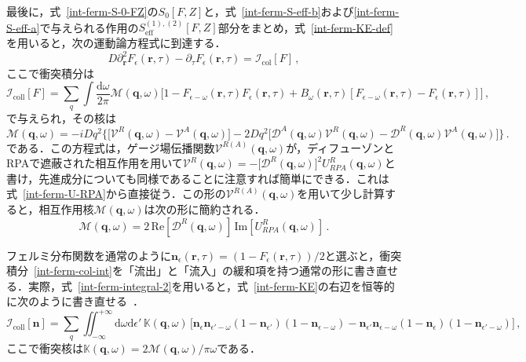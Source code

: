 \documentclass[a4paper,11pt]{ltjsarticle}
\def\d{\mathrm{d}}
\def\qo{(\mathbf{q},\omega)}
\begin{document}
最後に，式~\eqref{int-ferm-S-0-FZ}の$S_{0}[F,Z]$と，式~\eqref{int-ferm-S-eff-b}および\eqref{int-ferm-S-eff-a}で与えられる作用の$S^{(1),(2)}_{\mathrm{eff}}[F,Z]$部分をまとめ，式~\eqref{int-ferm-KE-def}を用いると，次の運動論方程式に到達する．
\begin{equation}\label{int-ferm-KE}
D\partial^{2}_{\mathbf{r}}F_{\epsilon}(\mathbf{r},\tau)-\partial_{\tau}
F_{\epsilon}(\mathbf{r},\tau)=\mathcal{I}_{\mathrm{col}}[F]\,,
\end{equation}
ここで衝突積分は
\begin{equation}\label{int-ferm-col-int}
\mathcal{I}_{\mathrm{coll}}[F]=\sum_{q}\int\frac{\d\omega}{2\pi}\mathcal{M}
\qo\Big[1 - F_{\epsilon-\omega}(\mathbf{r},\tau)
F_{\epsilon}(\mathbf{r},\tau) + B_{\omega}(\mathbf{r},\tau)
[F_{\epsilon-\omega}(\mathbf{r},\tau)-F_{\epsilon}(\mathbf{r},\tau)]\Big]\,,
\end{equation}
で与えられ，その核は
\begin{equation}
\mathcal{M}\qo=-iDq^2\Big\{\big[\mathcal{V}^{R}\qo-\mathcal{V}^{A}\qo\big]-2Dq^2
\big[\mathcal{D}^{A}\qo\mathcal{V}^{R}\qo-\mathcal{D}^{R}\qo\mathcal{V}^{A}\qo\big]\Big\}\,.
\end{equation}
である．この方程式は，ゲージ場伝播関数$\mathcal{V}^{R(A)}\qo$が，ディフューゾンとRPAで遮蔽された相互作用を用いて$\mathcal{V}^{R}\qo=-\big[\mathcal{D}^{R}\qo\big]^2U^{R}_{RPA}\qo$と書け，先進成分についても同様であることに注意すれば簡単にできる．これは式~\eqref{int-ferm-U-RPA}から直接従う．この形の$\mathcal{V}^{R(A)}\qo$を用いて少し計算すると，相互作用核$\mathcal{M}\qo$は次の形に簡約される．
\begin{equation}\label{int-ferm-col-int-kernel}
\mathcal{M}\qo=2\,\mathrm{Re}[\mathcal{D}^{R}\qo]\,\mathrm{Im}[U^{R}_{RPA}\qo]\,.
\end{equation}

フェルミ分布関数を通常のように$\mathbf{n}_{\epsilon}(\mathbf{r},\tau)=(1-F_{\epsilon}(\mathbf{r},\tau))/2$と選ぶと，衝突積分~\eqref{int-ferm-col-int}を「流出」と「流入」の緩和項を持つ通常の形に書き直せる．実際，式~\eqref{int-ferm-integral-2}を用いると，式~\eqref{int-ferm-KE}の右辺を恒等的に次のように書き直せる~\cite{Altshuler,AltshulerAronov-KE}．
\begin{equation}\label{int-ferm-col-int-in-out}
\mathcal{I}_{\mathrm{coll}}[\mathbf{n}]=\sum_{q}\iint^{+\infty}_{-\infty}\d\omega\d\epsilon'\,
\mathbb{K}\qo\,\Big[\mathbf{n}_{\epsilon}
\mathbf{n}_{\epsilon'-\omega}(1-\mathbf{n}_{\epsilon'})(1-\mathbf{n}_{\epsilon-\omega})
-\mathbf{n}_{\epsilon'}\mathbf{n}_{\epsilon-\omega}
(1-\mathbf{n}_{\epsilon})(1-\mathbf{n}_{\epsilon'-\omega})\Big]\,,
\end{equation}
ここで衝突核は$\mathbb{K}\qo=2\mathcal{M}\qo/\pi\omega$である．
\end{document}
